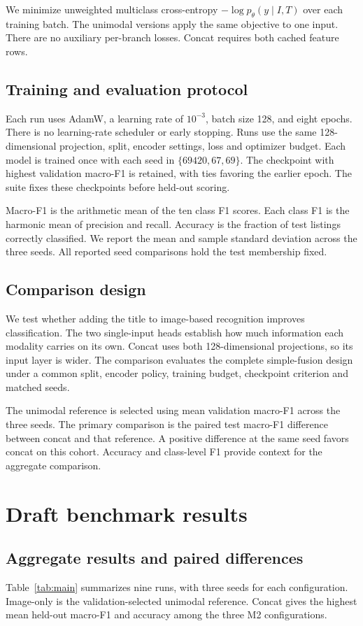 \documentclass[final]{hcmut-report}
\begin{document}
We minimize unweighted multiclass cross-entropy \(-\log p_\theta(y\mid I,T)\) over each training batch. The unimodal versions apply the same objective to one input. There are no auxiliary per-branch losses. Concat requires both cached feature rows.

\subsection{Training and evaluation protocol}
Each run uses AdamW, a learning rate of \(10^{-3}\), batch size 128, and eight epochs. There is no learning-rate scheduler or early stopping. Runs use the same 128-dimensional projection, split, encoder settings, loss and optimizer budget. Each model is trained once with each seed in \(\{69420,67,69\}\). The checkpoint with highest validation macro-F1 is retained, with ties favoring the earlier epoch. The suite fixes these checkpoints before held-out scoring.

Macro-F1 is the arithmetic mean of the ten class F1 scores. Each class F1 is the harmonic mean of precision and recall. Accuracy is the fraction of test listings correctly classified. We report the mean and sample standard deviation across the three seeds. All reported seed comparisons hold the test membership fixed.

\subsection{Comparison design}
We test whether adding the title to image-based recognition improves classification. The two single-input heads establish how much information each modality carries on its own. Concat uses both 128-dimensional projections, so its input layer is wider. The comparison evaluates the complete simple-fusion design under a common split, encoder policy, training budget, checkpoint criterion and matched seeds.

The unimodal reference is selected using mean validation macro-F1 across the three seeds. The primary comparison is the paired test macro-F1 difference between concat and that reference. A positive difference at the same seed favors concat on this cohort. Accuracy and class-level F1 provide context for the aggregate comparison.

\section{Draft benchmark results}
\subsection{Aggregate results and paired differences}
Table~\ref{tab:main} summarizes nine runs, with three seeds for each configuration. Image-only is the validation-selected unimodal reference. Concat gives the highest mean held-out macro-F1 and accuracy among the three M2 configurations.
\end{document}

